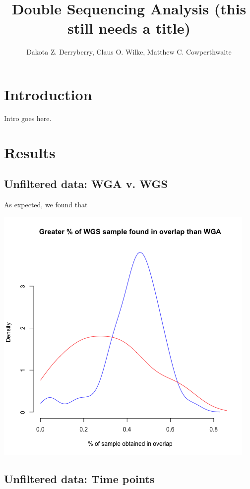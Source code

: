 \documentclass[11pt]{article} %
\title{Double Sequencing Analysis (this still needs a title)}
\author{Dakota Z. Derryberry, Claus O. Wilke, Matthew C. Cowperthwaite}
\begin{document}
\maketitle

\section{Introduction}

Intro goes here.

\section{Results}

\subsection{Unfiltered data: WGA v. WGS}

As expected, we found that 

\includegraphics[scale=0.5]{unfiltered_overlap_WGS_WGA_together_densities.png}

\subsection{Unfiltered data: Time points}
\end{document}
